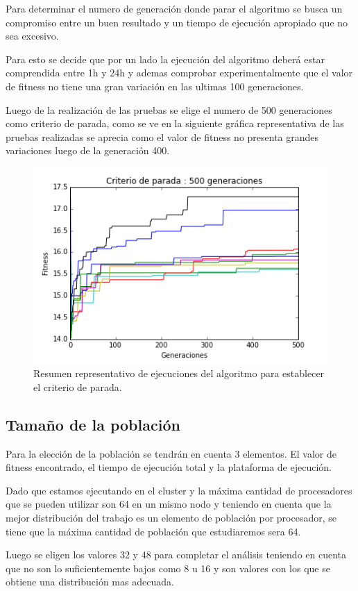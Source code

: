 Para determinar el numero de generación donde parar el algoritmo se busca un compromiso entre un buen resultado y un tiempo de ejecución apropiado que no sea excesivo.

Para esto se decide que por un lado la ejecución del algoritmo deberá estar comprendida entre 1h y 24h y ademas comprobar experimentalmente que el valor de fitness no tiene una gran variación en las ultimas 100 generaciones.

Luego de la realización de las pruebas se elige el numero de 500 generaciones como criterio de parada, como se ve en la siguiente gráfica representativa de las pruebas realizadas se aprecia como el valor de fitness no presenta grandes variaciones luego de la generación 400.


\begin{figure}[h]
\centering
\includegraphics[width=0.7\linewidth]{Figures/criterio_parada}
\caption{Resumen representativo de ejecuciones del algoritmo para establecer el criterio de parada.}
\label{fig:criterio_parada}
\end{figure}



\subsection{Tamaño de la población}

Para la elección de la población se tendrán en cuenta 3 elementos. El valor de fitness encontrado, el tiempo de ejecución total y la plataforma de ejecución.

Dado que estamos ejecutando en el cluster y la máxima cantidad de procesadores que se pueden utilizar son 64 en un mismo nodo y teniendo en cuenta que la mejor distribución del trabajo es un elemento de población por procesador, se tiene que la máxima cantidad de población que estudiaremos sera 64.

Luego se eligen los valores 32 y 48 para completar el análisis teniendo en cuenta que no son lo suficientemente bajos como 8 u 16 y son valores con los que se obtiene una distribución mas adecuada.

